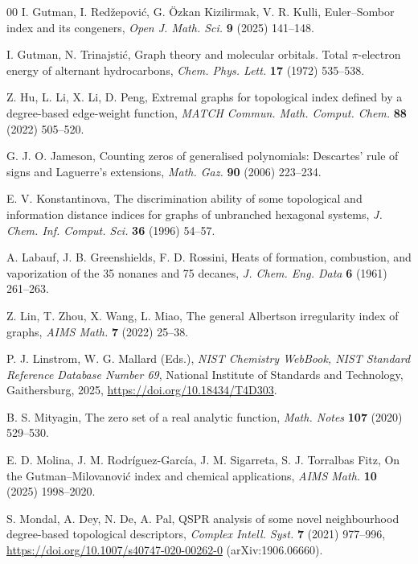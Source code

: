 \documentclass[a5paper, 10pt]{article}
\theoremstyle{plain}
\theoremstyle{remark}
\theoremstyle{definition}
\begin{document}
\begin{thebibliography}{00}
   I. Gutman, I. Red\v{z}epovi\'c,
  G. \"Ozkan Kizilirmak, V. R. Kulli, Euler--Sombor index and its congeners,
  \textit{Open J. Math. Sci.\/} \textbf{9} (2025) 141--148.

   I. Gutman, N. Trinajsti\'c, Graph theory
  and molecular orbitals. Total $\pi$-electron energy of alternant
  hydrocarbons, \textit{Chem. Phys. Lett.\/} \textbf{17} (1972) 535--538.

   Z. Hu, L. Li, X. Li, D. Peng, Extremal graphs
  for topological index defined by a degree-based edge-weight
  function, \textit{MATCH Commun. Math. Comput. Chem.\/} \textbf{88}
  (2022) 505--520.

   G. J. O. Jameson, Counting zeros of generalised
  polynomials: Descartes' rule of signs and Laguerre's extensions,
  \textit{Math. Gaz.\/} \textbf{90} (2006) 223--234.

   E. V. Konstantinova, The
  discrimination ability of some topological and information distance indices
  for graphs of unbranched hexagonal systems, \textit{J. Chem. Inf. Comput.
  Sci.\/} \textbf{36} (1996) 54--57.

   A. Labauf, J. B. Greenshields,
  F. D. Rossini, Heats of formation, combustion, and vaporization of the
  35 nonanes and 75 decanes, \textit{J. Chem. Eng. Data\/} \textbf{6}
  (1961) 261--263.

   Z. Lin, T. Zhou, X. Wang, L. Miao, The general
  Albertson irregularity index of graphs, \textit{AIMS Math.\/} \textbf{7}
  (2022) 25--38.

   P. J. Linstrom, W. G. Mallard (Eds.), \textit{NIST
  Chemistry WebBook, NIST Standard Reference Database Number 69\/}, National
  Institute of Standards and Technology, Gaithersburg, 2025,
  \url{https://doi.org/10.18434/T4D303}.

   B. S. Mityagin, The zero set of a real analytic
  function, \textit{Math. Notes\/} \textbf{107} (2020) 529--530.

   E. D. Molina, J. M.
  Rodr\'iguez-Garc\'ia, J. M. Sigarreta, S. J. Torralbas Fitz, On the
  Gutman--Milovanovi\'c index and chemical applications, \textit{AIMS
  Math.\/} \textbf{10} (2025) 1998--2020.

  S. Mondal, A. Dey, N. De, A. Pal, QSPR analysis of some novel
  neighbourhood degree-based topological descriptors, \textit{Complex
  Intell. Syst.\/} \textbf{7} (2021) 977--996,
  \url{https://doi.org/10.1007/s40747-020-00262-0} (arXiv:1906.06660).


\end{thebibliography}
\end{document}
